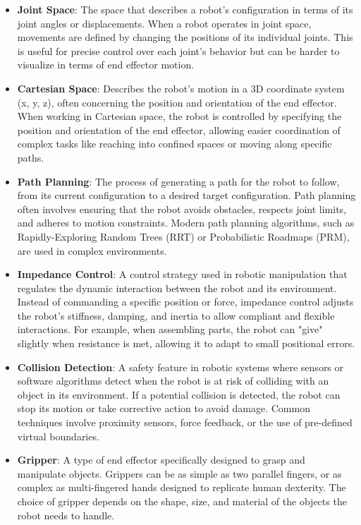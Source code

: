 \documentclass{article}
\begin{document}
\begin{itemize}
    \item \textbf{Joint Space}: 
    The space that describes a robot's configuration in terms of its joint angles or displacements. When a robot operates in joint space, movements are defined by changing the positions of its individual joints. This is useful for precise control over each joint's behavior but can be harder to visualize in terms of end effector motion.

    \item \textbf{Cartesian Space}: 
    Describes the robot's motion in a 3D coordinate system (x, y, z), often concerning the position and orientation of the end effector. When working in Cartesian space, the robot is controlled by specifying the position and orientation of the end effector, allowing easier coordination of complex tasks like reaching into confined spaces or moving along specific paths.

    \item \textbf{Path Planning}: 
    The process of generating a path for the robot to follow, from its current configuration to a desired target configuration. Path planning often involves ensuring that the robot avoids obstacles, respects joint limits, and adheres to motion constraints. Modern path planning algorithms, such as Rapidly-Exploring Random Trees (RRT) or Probabilistic Roadmaps (PRM), are used in complex environments.

    \item \textbf{Impedance Control}: 
    A control strategy used in robotic manipulation that regulates the dynamic interaction between the robot and its environment. Instead of commanding a specific position or force, impedance control adjusts the robot’s stiffness, damping, and inertia to allow compliant and flexible interactions. For example, when assembling parts, the robot can "give" slightly when resistance is met, allowing it to adapt to small positional errors.

    \item \textbf{Collision Detection}: 
    A safety feature in robotic systems where sensors or software algorithms detect when the robot is at risk of colliding with an object in its environment. If a potential collision is detected, the robot can stop its motion or take corrective action to avoid damage. Common techniques involve proximity sensors, force feedback, or the use of pre-defined virtual boundaries.

    \item \textbf{Gripper}: 
    A type of end effector specifically designed to grasp and manipulate objects. Grippers can be as simple as two parallel fingers, or as complex as multi-fingered hands designed to replicate human dexterity. The choice of gripper depends on the shape, size, and material of the objects the robot needs to handle.


\end{itemize}
\end{document}
